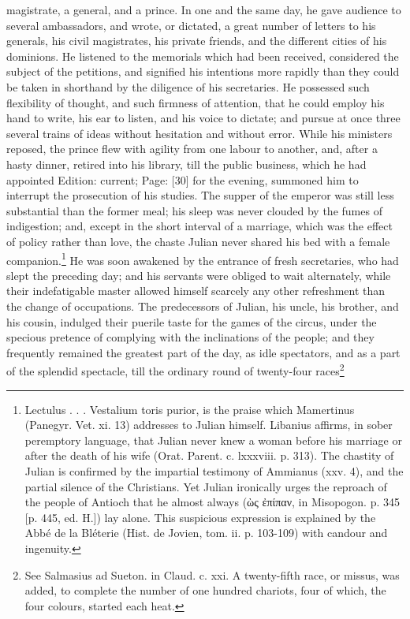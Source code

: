 magistrate, a general, and a prince. In one and the same day, he gave audience to several ambassadors, and wrote, or dictated, a great number of letters to his generals, his civil magistrates, his private friends, and the different cities of his dominions. He listened to the memorials which had been received, considered the subject of the petitions, and signified his intentions more rapidly than they could be taken in shorthand by the diligence of his secretaries. He possessed such flexibility of thought, and such firmness of attention, that he could employ his hand to write, his ear to listen, and his voice to dictate; and pursue at once three several trains of ideas without hesitation and without error. While his ministers reposed, the prince flew with agility from one labour to another, and, after a hasty dinner, retired into his library, till the public business, which he had appointed Edition: current; Page: [30] for the evening, summoned him to interrupt the prosecution of his studies. The supper of the emperor was still less substantial than the former meal; his sleep was never clouded by the fumes of indigestion; and, except in the short interval of a marriage, which was the effect of policy rather than love, the chaste Julian never shared his bed with a female companion.\footnote{Lectulus . . . Vestalium toris purior, is the praise which Mamertinus (Panegyr. Vet. xi. 13) addresses to Julian himself. Libanius affirms, in sober peremptory language, that Julian never knew a woman before his marriage or after the death of his wife (Orat. Parent. c. lxxxviii. p. 313). The chastity of Julian is confirmed by the impartial testimony of Ammianus (xxv. 4), and the partial silence of the Christians. Yet Julian ironically urges the reproach of the people of Antioch that he almost always (\textgreek{\texthebrew{ὼ}ς \texthebrew{ἐ}πίπαν}, in Misopogon. p. 345 [p. 445, ed. H.]) lay alone. This suspicious expression is explained by the Abbé de la Bléterie (Hist. de Jovien, tom. ii. p. 103-109) with candour and ingenuity.} He was soon awakened by the entrance of fresh secretaries, who had slept the preceding day; and his servants were obliged to wait alternately, while their indefatigable master allowed himself scarcely any other refreshment than the change of occupations. The predecessors of Julian, his uncle, his brother, and his cousin, indulged their puerile taste for the games of the circus, under the specious pretence of complying with the inclinations of the people; and they frequently remained the greatest part of the day, as idle spectators, and as a part of the splendid spectacle, till the ordinary round of twenty-four races\footnote{See Salmasius ad Sueton. in Claud. c. xxi. A twenty-fifth race, or missus, was added, to complete the number of one hundred chariots, four of which, the four colours, started each heat.

}
